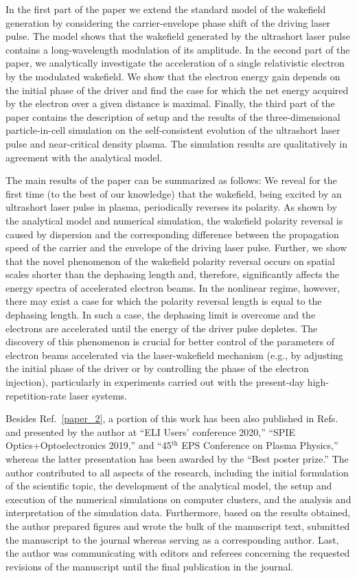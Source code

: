 \documentclass[10pt, a4paper, twoside, openright]{report}
\newcommand{\q}[1]{``#1''} %
\begin{document}
In the first part of the paper we extend the standard model of the wakefield generation by considering the carrier-envelope phase shift of the driving laser pulse. The model shows that the wakefield generated by the ultrashort laser pulse contains a long-wavelength modulation of its amplitude. In the second part of the paper, we analytically investigate the acceleration of a single relativistic electron by the modulated wakefield. We show that the electron energy gain depends on the initial phase of the driver and find the case for which the net energy acquired by the electron over a given distance is maximal. Finally, the third part of the paper contains the description of setup and the results of the three-dimensional particle-in-cell simulation on the self-consistent evolution of the ultrashort laser pulse and near-critical density plasma. The simulation results are qualitatively in agreement with the analytical model.

The main results of the paper can be summarized as follows: We reveal for the first time (to the best of our knowledge) that the wakefield, being excited by an ultrashort laser pulse in plasma, periodically reverses its polarity. As shown by the analytical model and numerical simulation, the wakefield polarity reversal is caused by dispersion and the corresponding difference between the propagation speed of the carrier and the envelope of the driving laser pulse. Further, we show that the novel phenomenon of the wakefield polarity reversal occurs on spatial scales shorter than the dephasing length and, therefore, significantly affects the energy spectra of accelerated electron beams. In the nonlinear regime, however, there may exist a case for which the polarity reversal length is equal to the dephasing length. In such a case, the dephasing limit is overcome and the electrons are accelerated until the energy of the driver pulse depletes. The discovery of this phenomenon is crucial for better control of the parameters of electron beams accelerated via the laser-wakefield mechanism (e.g., by adjusting the initial phase of the driver or by controlling the phase of the electron injection), particularly in experiments carried out with the present-day high-repetition-rate laser systems.

Besides Ref.~\ref{paper_2}, a portion of this work has been also published in Refs.~ and presented by the author at \q{ELI Users' conference 2020,} \q{SPIE Optics+Optoelectronics 2019,} and \q{45$ ^{\mathrm{th}} $ EPS Conference on Plasma Physics,} whereas the latter presentation has been awarded by the \q{Best poster prize.} The author contributed to all aspects of the research, including the initial formulation of the scientific topic, the development of the analytical model, the setup and execution of the numerical simulations on computer clusters, and the analysis and interpretation of the simulation data. Furthermore, based on the results obtained, the author prepared figures and wrote the bulk of the manuscript text, submitted the manuscript to the journal whereas serving as a corresponding author. Last, the author was communicating with editors and referees concerning the requested revisions of the manuscript until the final publication in the journal.
\end{document}
